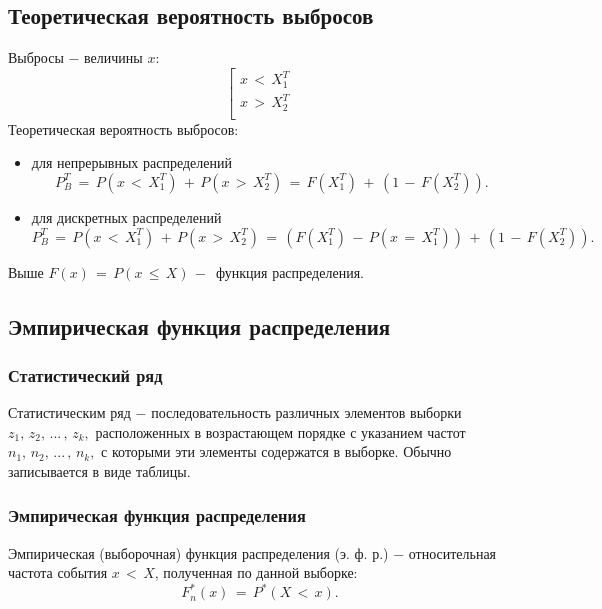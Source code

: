 \subsection{Теоретическая вероятность выбросов}
\begin{flushleft}
	Выбросы $-$ величины $x$: \\
	\begin{equation}
		\label{16} \left[
		\begin{gathered}
			x \, < \, X_1^T \\
			x \, > \, X_2^T \\
		\end{gathered}
		\right.
	\end{equation}
	Теоретическая вероятность выбросов:
	\begin{itemize}
	\item для непрерывных распределений
	\begin{equation}
		\label{17} P_B^T \, =\, P(x \,<\, X_1^T)\,+\, P(x \,>\, X_2^T)\,=\, F(X_1^T)\,+\,\left(1\,-\, F(X_2^T)\right).
	\end{equation}
	\item для дискретных распределений
	\begin{equation}
		\label{18} P_B^T \, =\, P(x \,<\, X_1^T)\,+\, P(x \,>\, X_2^T)\,=\,\left(F(X_1^T)\,-\, P(x \,=\, X_1^T)\right)\,+\,\left(1\,-\, F(X_2^T)\right).
	\end{equation}
	\end{itemize}
	Выше $ F(x)\,=\, P(x \,\leq\, X)\,-\, $ функция распределения.
\end{flushleft}

\subsection{Эмпирическая функция распределения}
\subsubsection{Статистический ряд}
\begin{flushleft}
	Статистическим ряд $-$ последовательность различных элементов выборки $z_1,\, z_2,\,...\,,\, z_k,$ расположенных в возрастающем порядке с указанием частот $n_1,\, n_2,\,...\,,\, n_k,$ с которыми эти элементы содержатся в выборке. Обычно записывается в виде таблицы.
\end{flushleft}

\subsubsection{Эмпирическая функция распределения}
\begin{flushleft}
	Эмпирическая (выборочная) функция распределения (э. ф. р.) $-$ относительная частота события $x \,<\, X$, полученная по данной выборке:
	\begin{equation}
		\label{19} F_n^*(x)\,=\, P^*(X \,<\, x).
	\end{equation}
\end{flushleft}

